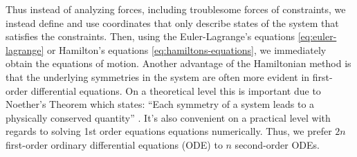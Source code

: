 Thus instead of analyzing forces, including troublesome forces of constraints, we instead define and use coordinates that only describe states of the system that satisfies the constraints. Then, using the Euler-Lagrange's equations \eqref{eq:euler-lagrange} or Hamilton's equations \eqref{eq:hamiltons-equations}, we immediately obtain the equations of motion. Another advantage of the Hamiltonian method is that the underlying symmetries in the system are often more evident in first-order differential equations. On a theoretical level this is important due to Noether's Theorem which states: ``Each symmetry of a system leads to a physically conserved quantity'' \cite{noethers}. It's also convenient on a practical level with regards to solving 1st order equations equations numerically. Thus, we prefer $2 n$ first-order ordinary differential equations (ODE) to $n$ second-order ODEs.


